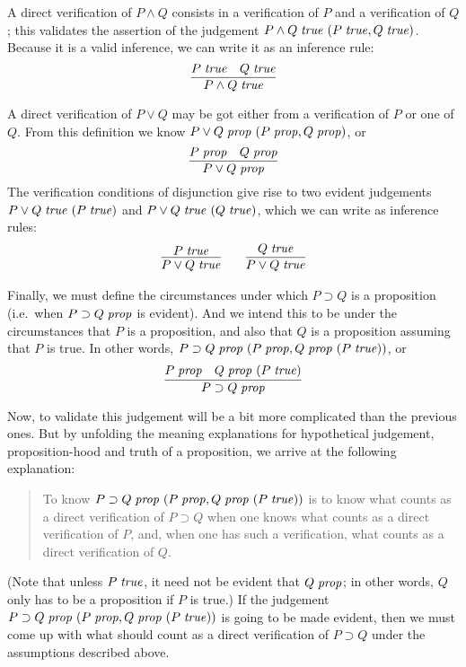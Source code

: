 \documentclass[main.tex]{subfiles}
\begin{document}
A direct verification of $P\land Q$ consists in a verification of $P$
and a verification of $Q$; this validates the assertion of the judgement
$P\land Q\;\mathit{true}\ (P\;\mathit{true},Q\;\mathit{true})$. Because it is a valid
inference, we can write it as an inference rule:
\[
  \infer{
    \istrue{P\land Q}
  }{
    \istrue{P} &
    \istrue{Q}
  }
\]

A direct verification of $P\lor Q$ may be got either from a verification
of $P$ or one of $Q$. From this definition we know $P\lor
Q\;\mathit{prop}\ (P\;\mathit{prop},Q\;\mathit{prop})$, or
\[
  \infer{
    \isprop{P\lor Q}
  }{
    \isprop{P} &
    \isprop{Q}
  }
\]
The verification conditions of disjunction give
rise to two evident judgements $P\lor Q\;\mathit{true}\ (P\;\mathit{true})$ and
$P\lor Q\;\mathit{true}\ (Q\;\mathit{true})$, which we can write as inference rules:
\begin{gather*}
  \infer{
    \istrue{P\lor Q}
  }{
    \istrue{P}
  }
  \qquad
  \infer{
    \istrue{P\lor Q}
  }{
    \istrue{Q}
  }
\end{gather*}

Finally, we must define the circumstances under which $P\supset Q$ is
a proposition (i.e.\ when $P\supset Q\;\mathit{prop}$ is evident). And we
intend this to be under the circumstances that $P$ is a proposition,
and also that $Q$ is a proposition assuming that $P$ is true. In other
words, $P\supset Q\;\mathit{prop}\ (P\;\mathit{prop},
Q\;\mathit{prop}\ (P\;\mathit{true}))$, or
\[
  \infer{
    \isprop{P\supset Q}
  }{
    \isprop{P} &
    \hyp{\isprop{Q}}{\istrue{P}}
  }
\]

Now, to validate this judgement will be a bit more complicated than the
previous ones. But by unfolding the meaning explanations for hypothetical
judgement, proposition-hood and truth of a proposition, we arrive at the
following explanation:
\begin{quote}
  To know $P\supset Q\;\mathit{prop}\ (P\;\mathit{prop},Q\;\mathit{prop}\ (P\;\mathit{true}))$ is
  to know what counts as a direct verification of $P\supset Q$ when one knows what
  counts as a direct verification of $P$, and, when one has such a verification, what
  counts as a direct verification of $Q$.
\end{quote}

(Note that unless $P\;\mathit{true}$, it need not be evident that
$Q\;\mathit{prop}$; in other words, $Q$ only has to be a proposition if $P$
is true.) If the judgement $P\supset
Q\;\mathit{prop}\ (P\;\mathit{prop},Q\;\mathit{prop}\ (P\;\mathit{true}))$ is going to be made
evident, then we must come up with what should count as a direct
verification of $P\supset Q$ under the assumptions described above.
\end{document}

